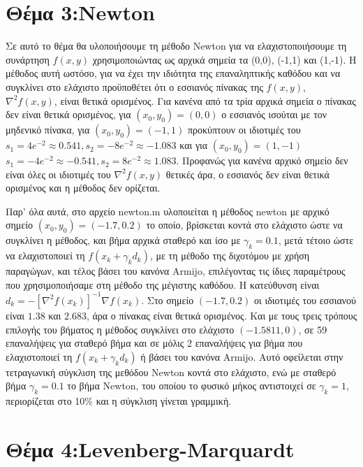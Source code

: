 \documentclass[11pt,a4paper,onecolumn,final]{article}
\begin{document}
{{\begin{flushleft}
\section{Θέμα 3:Newton}

Σε αυτό το θέμα θα υλοποιήσουμε τη μέθοδο Newton για να ελαχιστοποιήσουμε τη συνάρτηση \(f(x,y)\) χρησιμοποιώντας ως αρχικά σημεία τα (0,0), (-1,1) και (1,-1). Η μέθοδος αυτή ωστόσο, για να έχει την ιδιότητα της επαναληπτικής καθόδου και να συγκλίνει στο ελάχιστο προϋποθέτει ότι ο εσσιανός πίνακας της \(f(x,y)\), \(\nabla^2 f(x,y)\), είναι θετικά ορισμένος. Για κανένα από τα τρία αρχικά σημεία ο πίνακας δεν είναι θετικά ορισμένος, για \((x_{0},y_{0})=(0,0)\) ο εσσιανός ισούται με τον μηδενικό πίνακα, για 
\((x_{0},y_{0})=(-1,1)\) προκύπτουν οι ιδιοτιμές του \(s_{1}=4e^{-2}\approx0.541, s_{2}=-8e^{-2}\approx-1.083\) και για \((x_{0},y_{0})=(1,-1)\) \(s_{1}=-4e^{-2}\approx-0.541, s_{2}=8e^{-2}\approx1.083\). Προφανώς για κανένα αρχικό σημείο δεν είναι όλες οι ιδιοτιμές του \(\nabla^2 f(x,y)\) θετικές άρα, ο εσσιανός δεν είναι θετικά ορισμένος και η μέθοδος δεν ορίζεται.

Παρ' όλα αυτά, στο αρχείο newton.m υλοποιείται η μέθοδος newton με αρχικό σημείο \((x_{0},y_{0})=(-1.7,0.2)\) το οποίο, βρίσκεται κοντά στο ελάχιστο ώστε να συγκλίνει η μέθοδος, και βήμα αρχικά σταθερό και ίσο με \(\gamma_{k}=0.1\), μετά τέτοιο ώστε να ελαχιστοποιεί τη \(f(x_{k}+\gamma_{k}d_{k})\), με τη μέθοδο της διχοτόμου με χρήση παραγώγων, και τέλος βάσει του κανόνα Armijo, επιλέγοντας τις ίδιες παραμέτρους που χρησιμοποιήσαμε στη μέθοδο της μέγιστης καθόδου. Η κατεύθυνση είναι \(d_{k}=-[\nabla^2 f(x_{k})]^{-1}\nabla f(x_{k})\). Στο σημείο \((-1.7,0.2)\) οι ιδιοτιμές του εσσιανού είναι \(1.38\) και \(2.683\), άρα ο πίνακας είναι θετικά ορισμένος. Και με τους τρεις τρόπους επιλογής του βήματος η μέθοδος συγκλίνει στο ελάχιστο \((-1.5811,0)\), σε 59 επαναλήψεις για σταθερό βήμα και σε μόλις 2 επαναλήψεις για βήμα που ελαχιστοποιεί τη \(f(x_{k}+\gamma_{k}d_{k})\) ή βάσει του κανόνα Armijo. Αυτό οφείλεται στην τετραγωνική σύγκλιση της μεθόδου Newton κοντά στο ελάχιστο, ενώ με σταθερό βήμα \(\gamma_{k}=0.1\) το βήμα Newton, του οποίου το φυσικό μήκος αντιστοιχεί σε \(\gamma_{k}=1\), περιορίζεται στο 10\% και η σύγκλιση γίνεται γραμμική.

\section{Θέμα 4:Levenberg-Marquardt}


\end{flushleft}}}
\end{document}
